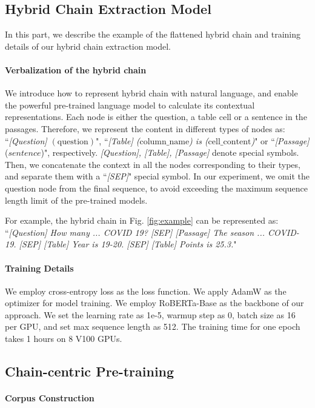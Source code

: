 \documentclass[11pt]{article}
\begin{document}
\subsection{Hybrid Chain Extraction Model}
\label{appendix:chain-extractor}
In this part, we describe the example of the flattened hybrid chain and training details of our
hybrid chain extraction model. 
\paragraph{Verbalization of the hybrid chain}
We introduce how to represent hybrid chain with natural language, and enable the powerful pre-trained language model to calculate its contextual representations.
Each node is either the question, a table cell or a sentence in the passages. Therefore, we represent the content in different types of nodes as: ``\textit{[Question] $(\text{question})$}", 
``\textit{[Table] ($\text{column}\_\text{name}$) is ($\text{cell}\_\text{content}$)}" or ``\textit{[Passage]} ($\textit{sentence}$)", respectively. 
\textit{[Question], [Table], [Passage]} denote special symbols. 
Then, we concatenate the context in all the nodes corresponding to their types, and separate them with a ``\textit{[SEP]}" special symbol. In our experiment, we omit the question node from the final sequence, to avoid exceeding the maximum sequence length limit of the pre-trained models.

For example, the hybrid chain in Fig. \ref{fig:example} can be represented as:
``\textit{[Question] How many ... COVID 19? [SEP] [Passage] The season ... COVID-19. [SEP] [Table] Year is 19-20. [SEP] [Table] Points is 25.3.}"
 
\paragraph{Training Details}
We employ cross-entropy loss as the
loss function. We apply AdamW as the optimizer
for model training. We employ RoBERTa-Base as
the backbone of our approach. We set the learning rate as 1e-5, warmup
step as 0, batch size as 16 per GPU, and set max sequence
length as 512. The training time for one
epoch takes 1 hours on 8 V100 GPUs.

\subsection{Chain-centric Pre-training}

\paragraph{Corpus Construction}
\end{document}

